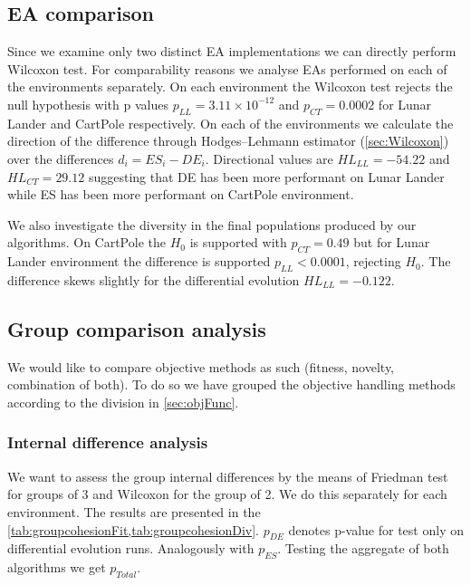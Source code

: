 \subsection{EA comparison}
Since we examine only two distinct EA implementations we can directly perform Wilcoxon test. For comparability reasons we analyse EAs performed on each of the environments separately. On each environment the Wilcoxon test rejects the null hypothesis with p values $ p_{LL} = 3.11 \times 10^{-12} $ and $ p_{CT} = 0.0002$ for Lunar Lander and CartPole respectively. On each of the environments we calculate the direction of the difference  through Hodges–Lehmann estimator (\cref{sec:Wilcoxon}) over the differences $  d_i = ES_i - DE_i $. 
Directional values are $ HL_{LL} = -54.22 $ and $ HL_{CT} = 29.12 $ suggesting that DE has been more performant on Lunar Lander while ES has been more performant on CartPole environment.

We also investigate the diversity in the final populations produced by our algorithms. On CartPole the $H_0$ is supported with $ p_{CT} = 0.49 $ but for Lunar Lander environment the difference is supported $ p_{LL} < 0.0001 $, rejecting $H_0$. The difference skews slightly for the differential evolution $ HL_{LL} = -0.122 $.

\subsection{Group comparison analysis}
We would like to compare objective methods as such (fitness, novelty, combination of both). To do so we have grouped the objective handling methods according to the division in \cref{sec:objFunc}.
\subsubsection{Internal difference analysis}
 We want to assess the group internal differences by the means of Friedman test for groups of 3 and Wilcoxon for the group of 2. We do this separately for each environment. The results are presented in the \cref{tab:groupcohesionFit,tab:groupcohesionDiv}.
 $p_{DE}$ denotes p-value for test only on differential evolution runs. Analogously with $p_{ES}$. Testing the aggregate of both algorithms we get $p_{Total}$.   
 
